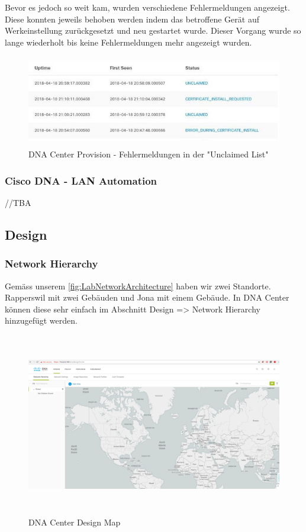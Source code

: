 Bevor es jedoch so weit kam, wurden verschiedene Fehlermeldungen angezeigt. Diese konnten jeweils behoben werden indem das betroffene Gerät auf Werkeinstellung zurückgesetzt und neu gestartet wurde. Dieser Vorgang wurde so lange wiederholt bis keine Fehlermeldungen mehr angezeigt wurden. 

\begin{figure}[H]
	\centering
	\includegraphics[height=4cm]{img/DNA_Center_Unclaimed_Errors_1.PNG}
	\caption{DNA Center Provision - Fehlermeldungen in der "Unclaimed List"}
	\label{fig:dna-center-provision-unclaimed-2}
\end{figure}

\subsubsection{Cisco DNA - LAN Automation}

//TBA

\subsection{Design}

\subsubsection{Network Hierarchy}

Gemäss unserem \ref{fig:LabNetworkArchitecture} haben wir zwei Standorte. Rapperswil mit zwei Gebäuden und Jona mit einem Gebäude.
In DNA Center können diese sehr einfach im Abschnitt Design => Network Hierarchy hinzugefügt werden.

\begin{figure}[H]
	\centering
	\includegraphics[height=8cm]{img/Selection_011.png}
	\caption{DNA Center Design Map}
	\label{fig:dna-center-design-1}
\end{figure}

